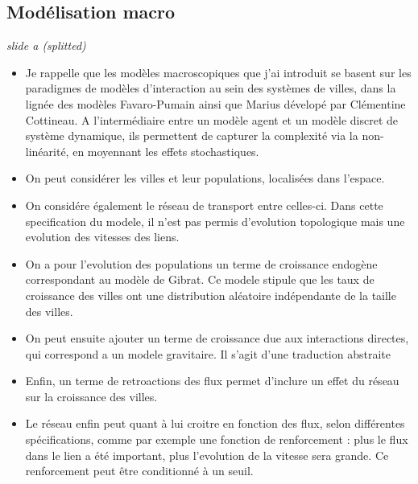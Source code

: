 \documentclass[12pt]{article}
\begin{document}
\newpage



\subsection*{Modélisation macro}


\textit{slide a (splitted)}

\begin{itemize}
	\item Je rappelle que les modèles macroscopiques que j'ai introduit se basent sur les paradigmes de modèles d'interaction au sein des systèmes de villes, dans la lignée des modèles Favaro-Pumain ainsi que Marius dévelopé par Clémentine Cottineau. A l'intermédiaire entre un modèle agent et un modèle discret de système dynamique, ils permettent de capturer la complexité via la non-linéarité, en moyennant les effets stochastiques.
	\item On peut considérer les villes et leur populations, localisées dans l'espace.
	\item On considére également le réseau de transport entre celles-ci. Dans cette specification du modele, il n'est pas permis d'evolution topologique mais une evolution des vitesses des liens. 
	\item On a pour l'evolution des populations un terme de croissance endogène correspondant au modèle de Gibrat. Ce modele stipule que les taux de croissance des villes ont une distribution aléatoire indépendante de la taille des villes.
	\item On peut ensuite ajouter un terme de croissance due aux interactions directes, qui correspond a un modele gravitaire. Il s'agit d'une traduction abstraite
	\item Enfin, un terme de retroactions des flux permet d'inclure un effet du réseau sur la croissance des villes.
	\item Le réseau enfin peut quant à lui croitre en fonction des flux, selon différentes spécifications, comme par exemple une fonction de renforcement : plus le flux dans le lien a été important, plus l'evolution de la vitesse sera grande. Ce renforcement peut être conditionné à un seuil.
\end{itemize}
\end{document}
